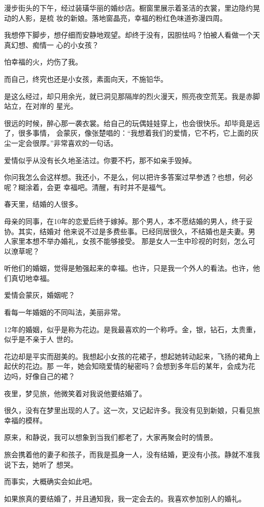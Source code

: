 		漫步街头的下午，经过装璜华丽的婚纱店。橱窗里展示着圣洁的衣裳，里边隐约晃动的人影，是梳
	妆的新娘。落地窗晶亮，幸福的粉红色味道弥漫四周。

		我想停下脚步，想仔细而安静地观望。却终于没有，因胆怯吗？怕被人看做一个天真幻想、痴情一
	心的小女孩？

		怕幸福的火，灼伤了我。

		而自己，终究也还是小女孩，素面向天，不施铅华。

		是这么经过，却只用余光，就已洞见那隔岸的烈火漫天，照亮夜空荒芜。我是赤脚站立，在对岸的
	星光。

		很远的时候，醉心那一袭衣裳。给自己的玩偶娃娃穿上，也会很快乐。却毕竟是远了，很多事情，
	会蒙灰，像张楚唱的：“我想着我们的爱情，它不朽，它上面的灰尘一定会很厚。”非常喜欢的一句话。

		爱情似乎从没有长久地圣洁过。你要不朽，那不如亲手毁掉。

		你问我怎么会这样想。我还小，不是么，何以把许多答案过早参透？也想，何必呢？糊涂着，会更
	幸福吧。清醒，有时并不是福气。

		春天里，结婚的人很多。

		母亲的同事，在10年的恋爱后终于嫁掉。那个男人，本不愿结婚的男人，终于妥协。其实，结婚对
	他来说不过是多费些事。已经同居很久，不结婚也是夫妻。男人家里本想不举办婚礼，女孩不能够接受。
	那是女人一生中珍视的时刻，怎么可以潦草呢？

		听他们的婚姻，觉得是勉强起来的幸福。也许，只是我一个外人的看法。也许，他们真切地幸福。

		爱情会蒙灰，婚姻呢？

		看每一年婚姻的不同叫法，美丽非常。

		12年的婚姻，似乎是称为花边。是我最喜欢的一个称呼。金，银，钻石，太贵重，似乎是不亲于人
	世的。

		花边却是平实而甜美的。我想起小女孩的花裙子，想起她转动起来，飞扬的裙角上起伏的花边。那
	一年，她会知晓爱情的秘密吗？会想到多年后的某年，会成为花边吗，好像自己的裙？

		夜里，梦见旅，他微笑着对我说他要结婚了。

		很久，没有在梦里出现的人了。这一次，又记起许多。我没有见到新娘，只看见旅幸福的模样。

		原来，和静说，我可以想象到当我们都老了，大家再聚会时的情景。

		旅会携着他的妻子和孩子，而我是孤身一人，没有结婚，更没有小孩。静就不准我说下去，她听了
	想哭。

		而事实，大概确实会如此吧。

		如果旅真的要结婚了，并且通知我，我一定会去的。我喜欢参加别人的婚礼。

